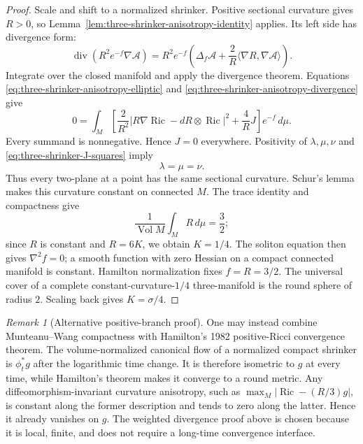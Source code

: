\documentclass[10pt]{coll-l}
\theoremstyle{definition}
\theoremstyle{remark}
\newtheorem{remark}[theorem]{Remark}
\numberwithin{section}{chapter}
\numberwithin{equation}{chapter}
\newcommand{\Ric}{\operatorname{Ric}}
\newcommand{\Vol}{\operatorname{Vol}}
\begin{document}
\begin{proof}
Scale and shift to a normalized shrinker.  Positive sectional curvature
gives $R>0$, so Lemma~\ref{lem:three-shrinker-anisotropy-identity} applies.
Its left side has divergence form:
\begin{equation}
 \operatorname{div}\!\left(R^2e^{-f}\nabla\mathcal A\right)
  =R^2e^{-f}\left(
      \Delta_f\mathcal A+\frac{2}{R}
             \langle\nabla R,\nabla\mathcal A\rangle
    \right).                                             \label{eq:three-shrinker-anisotropy-divergence}
\end{equation}
Integrate over the closed manifold and apply the divergence theorem.
Equations \eqref{eq:three-shrinker-anisotropy-elliptic} and
\eqref{eq:three-shrinker-anisotropy-divergence} give
\begin{equation}
 0=\int_M\left[
       \frac2{R^2}|R\nabla\Ric-dR\otimes\Ric|^2
        +\frac4R J
      \right]e^{-f}\,d\mu.                              \label{eq:three-shrinker-anisotropy-integral}
\end{equation}
Every summand is nonnegative.  Hence $J=0$ everywhere.  Positivity of
$\lambda,\mu,\nu$ and
\eqref{eq:three-shrinker-J-squares} imply
\[
                             \lambda=\mu=\nu.
\]
Thus every two-plane at a point has the same sectional curvature.  Schur's
lemma makes this curvature constant on connected $M$.  The trace identity
and compactness give
\[
       \frac1{\Vol M}\int_MR\,d\mu=\frac32;
\]
since $R$ is constant and $R=6K$, we obtain $K=1/4$.  The soliton equation
then gives $\nabla^2f=0$; a smooth function with zero Hessian on a compact
connected manifold is constant.  Hamilton normalization fixes
$f=R=3/2$.  The universal cover of a complete constant-curvature-$1/4$
three-manifold is the round sphere of radius $2$.  Scaling back gives
$K=\sigma/4$.
\end{proof}

\begin{remark}[Alternative positive-branch proof]
\label{rem:positive-three-shrinker-hamilton-alternative}
One may instead combine Munteanu--Wang compactness with Hamilton's 1982
positive-Ricci convergence theorem.  The volume-normalized canonical flow
of a normalized compact shrinker is $\phi_t^*g$ after the logarithmic time
change.  It is therefore isometric to $g$ at every time, while Hamilton's
theorem makes it converge to a round metric.  Any diffeomorphism-invariant
curvature anisotropy, such as
$\max_M|\Ric-(R/3)g|$, is constant along the former description and tends
to zero along the latter.  Hence it already vanishes on $g$.  The weighted
divergence proof above is chosen because it is local, finite, and does not
require a long-time convergence interface.
\end{remark}
\end{document}
